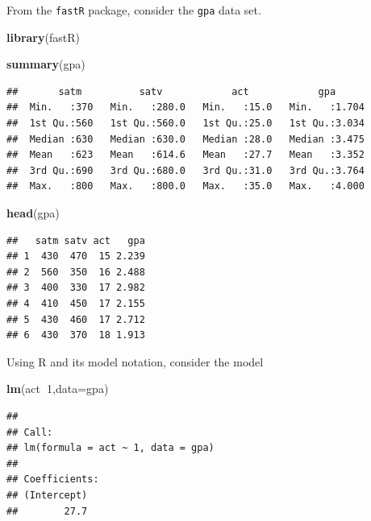 \documentclass[]{book}
\newenvironment{Shaded}{\begin{snugshade}}{\end{snugshade}}
\newcommand{\KeywordTok}[1]{\textcolor[rgb]{0.13,0.29,0.53}{\textbf{#1}}}
\newcommand{\DataTypeTok}[1]{\textcolor[rgb]{0.13,0.29,0.53}{#1}}
\newcommand{\DecValTok}[1]{\textcolor[rgb]{0.00,0.00,0.81}{#1}}
\newcommand{\OperatorTok}[1]{\textcolor[rgb]{0.81,0.36,0.00}{\textbf{#1}}}
\newcommand{\NormalTok}[1]{#1}
\theoremstyle{definition}
\theoremstyle{definition}
\theoremstyle{definition}
\theoremstyle{remark}
\begin{document}
From the \texttt{fastR} package, consider the \texttt{gpa} data set.

\begin{Shaded}
\begin{Highlighting}[]
\KeywordTok{library}\NormalTok{(fastR)}
\end{Highlighting}
\end{Shaded}

\begin{Shaded}
\begin{Highlighting}[]
\KeywordTok{summary}\NormalTok{(gpa)}
\end{Highlighting}
\end{Shaded}

\begin{verbatim}
##       satm          satv            act            gpa       
##  Min.   :370   Min.   :280.0   Min.   :15.0   Min.   :1.704  
##  1st Qu.:560   1st Qu.:560.0   1st Qu.:25.0   1st Qu.:3.034  
##  Median :630   Median :630.0   Median :28.0   Median :3.475  
##  Mean   :623   Mean   :614.6   Mean   :27.7   Mean   :3.352  
##  3rd Qu.:690   3rd Qu.:680.0   3rd Qu.:31.0   3rd Qu.:3.764  
##  Max.   :800   Max.   :800.0   Max.   :35.0   Max.   :4.000
\end{verbatim}

\begin{Shaded}
\begin{Highlighting}[]
\KeywordTok{head}\NormalTok{(gpa)}
\end{Highlighting}
\end{Shaded}

\begin{verbatim}
##   satm satv act   gpa
## 1  430  470  15 2.239
## 2  560  350  16 2.488
## 3  400  330  17 2.982
## 4  410  450  17 2.155
## 5  430  460  17 2.712
## 6  430  370  18 1.913
\end{verbatim}

Using R and its model notation, consider the model

\begin{Shaded}
\begin{Highlighting}[]
\KeywordTok{lm}\NormalTok{(act}\OperatorTok{~}\DecValTok{1}\NormalTok{,}\DataTypeTok{data=}\NormalTok{gpa)}
\end{Highlighting}
\end{Shaded}

\begin{verbatim}
## 
## Call:
## lm(formula = act ~ 1, data = gpa)
## 
## Coefficients:
## (Intercept)  
##        27.7
\end{verbatim}
\end{document}
